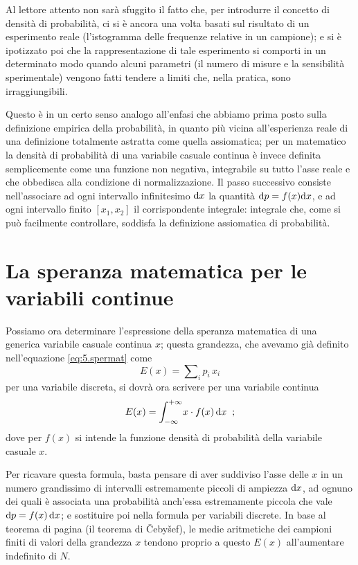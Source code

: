 Al lettore attento non sar\`a sfuggito il fatto che, per
introdurre il concetto di densit\`a di probabilit\`a, ci si
\`e ancora una volta basati sul risultato di un esperimento
reale (l'istogramma delle frequenze relative in un
campione); e si \`e ipotizzato poi che la rappresentazione
di tale esperimento si comporti in un determinato modo
quando alcuni parametri (il numero di misure e la
sensibilit\`a sperimentale) vengono fatti tendere a limiti
che, nella pratica, sono irraggiungibili.

Questo \`e in un certo senso analogo all'enfasi che abbiamo
prima posto sulla definizione empirica della probabilit\`a,
in quanto pi\`u vicina all'esperienza reale di una
definizione totalmente astratta come quella assiomatica; per
un matematico la densit\`a di probabilit\`a di una variabile
casuale continua \`e invece definita semplicemente come una
funzione non negativa, integrabile su tutto l'asse reale e
che obbedisca alla condizione di normalizzazione.  Il passo
successivo consiste nell'associare ad ogni intervallo
infinitesimo $\mathrm{d} x$ la quantit\`a $\mathrm{d} p = f(x) \mathrm{d} x$, e
ad ogni intervallo finito $ [ x_1, x_2 ] $ il corrispondente
integrale: integrale che, come si pu\`o facilmente
controllare, soddisfa la definizione assiomatica di
probabilit\`a.

\section{La speranza matematica per le variabili
  continue}%
%
\label{ch:6.mevaco}
Possiamo ora determinare l'espressione della speranza
matematica di una generica variabile casuale continua $x$;
questa grandezza, che avevamo gi\`a definito nell'equazione
\eqref{eq:5.spermat} come
\begin{equation*}
  E(x) = \sum \nolimits_i p_i \, x_i
\end{equation*}
per una variabile discreta, si dovr\`a ora scrivere per una
variabile continua
\begin{equation*}
  E(x) = \int_{- \infty}^{+ \infty} \! x \cdot f(x) \,
    \mathrm{d} x \;\; ;
\end{equation*}
dove per $f(x)$ si intende la funzione densit\`a di
probabilit\`a della variabile casuale $x$.

Per ricavare questa formula, basta pensare di aver suddiviso
l'asse delle $x$ in un numero grandissimo di intervalli
estremamente piccoli di ampiezza $\mathrm{d} x$, ad ognuno dei
quali \`e associata una probabilit\`a anch'essa estremamente
piccola che vale $\mathrm{d} p = f(x) \, \mathrm{d} x$; e sostituire poi
nella formula per variabili discrete.  In base al teorema di
pagina \pageref{th:5.teoceb} (il teorema di \v Ceby\v sef),%
le medie aritmetiche dei campioni finiti di valori della
grandezza $x$ tendono proprio a questo $E(x)$ all'aumentare
indefinito di $N$.

